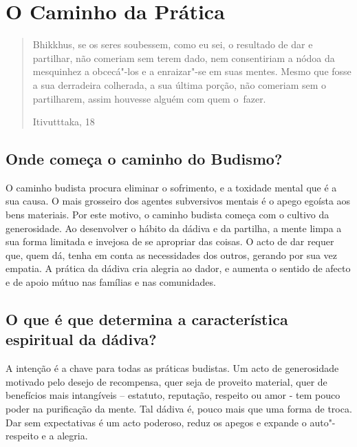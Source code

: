 

\setlength{\chapterTitleTopSkip}{0mm}

\chapter{O Caminho da Prática}

\clearpage


\begin{verse}

Bhikkhus, se os seres soubessem, como eu sei, o resultado de dar e
partilhar, não comeriam sem terem dado, nem consentiriam a nódoa da
mesquinhez a obcecá"-los e a enraizar"-se em suas mentes. Mesmo que fosse
a sua derradeira colherada, a sua última porção, não comeriam sem o
partilharem, assim houvesse alguém com quem o~fazer.

{\raggedleft
Itivutttaka, 18
\par}

\end{verse}


\section{Onde começa o caminho do Budismo?}

O caminho budista procura eliminar o sofrimento, e a toxidade mental que
é a sua causa. O mais grosseiro dos agentes subversivos mentais é o
apego egoísta aos bens materiais. Por este motivo, o caminho budista
começa com o cultivo da generosidade. Ao desenvolver o hábito da dádiva
e da partilha, a mente limpa a sua forma limitada e invejosa de se
apropriar das coisas. O acto de dar requer que, quem dá, tenha em conta
as necessidades dos outros, gerando por sua vez empatia. A prática da
dádiva cria alegria ao dador, e aumenta o sentido de afecto e de apoio
mútuo nas famílias e nas comunidades.

\section{O que é que determina a característica espiritual da dádiva?}

A intenção é a chave para todas as práticas budistas. Um acto de
generosidade motivado pelo desejo de recompensa, quer seja de proveito
material, quer de benefícios mais intangíveis -- estatuto, reputação,
respeito ou amor - tem pouco poder na purificação da mente. Tal dádiva
é, pouco mais que uma forma de troca. Dar sem expectativas é um acto
poderoso, reduz os apegos e expande o auto"-respeito e a alegria.

